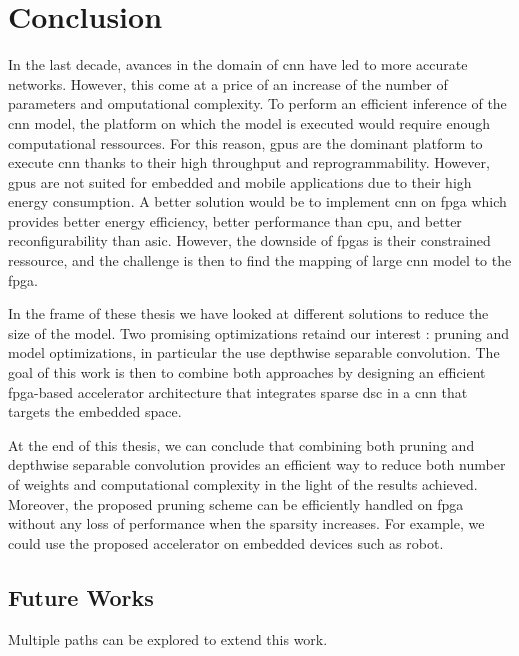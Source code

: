 \chapter*{Conclusion}
%
In the last decade, avances in the domain of \acrshort{cnn} have led to more accurate networks. However, this come at a price of an increase of the number of parameters and omputational complexity. To perform an efficient inference of the \acrshort{cnn} model, the platform on which the model is executed would require enough computational ressources. For this reason, \acrshort{gpu}s are the dominant platform to execute \acrshort{cnn} thanks to their high throughput and reprogrammability. However, \acrshort{gpu}s are not suited for embedded and mobile applications due to their high energy consumption. A better solution would be to implement \acrshort{cnn} on \acrshort{fpga} which provides better energy efficiency, better performance than \acrshort{cpu}, and better reconfigurability than \acrshort{asic}. However, the downside of \acrshort{fpga}s is their constrained ressource, and the challenge is then to find the mapping of large \acrshort{cnn} model to the \acrshort{fpga}.

In the frame of these thesis we have looked at different solutions to reduce the size of the model. Two promising optimizations retaind our interest : pruning and model optimizations, in particular the use depthwise separable convolution. The goal of this work is then to combine both approaches by designing an efficient \acrshort{fpga}-based accelerator architecture that integrates sparse \acrshort{dsc} in a \acrshort{cnn} that targets the embedded space.

At the end of this thesis, we can conclude that combining both pruning and depthwise separable convolution provides an efficient way to reduce both number of weights and computational complexity in the light of the results achieved. Moreover, the proposed pruning scheme can be efficiently handled on \acrshort{fpga} without any loss of performance when the sparsity increases. For example, we could use the proposed accelerator on embedded devices such as robot.
%
\section*{Future Works}
%
Multiple paths can be explored to extend this work.

